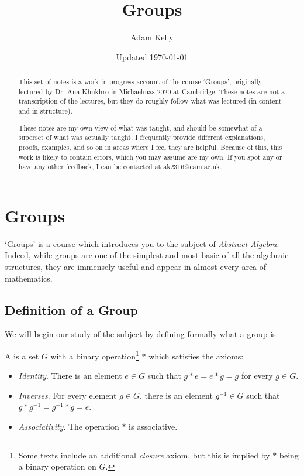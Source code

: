 \documentclass[a4]{scrreprt}
\title{Groups}
\author{Adam Kelly}
\date{Updated \today}
\begin{document}
\maketitle

\begin{abstract}
	This set of notes is a work-in-progress account of the course `Groups', originally lectured by Dr. Ana Khukhro in Michaelmas 2020 at Cambridge. These notes are not a transcription of the lectures, but they do roughly follow what was lectured (in content and in structure).

	These notes are my own view of what was taught, and should be somewhat of a superset of what was actually taught. I frequently provide different explanations, proofs, examples, and so on in areas where I feel they are helpful. Because of this, this work is likely to contain errors, which you may assume are my own. If you spot any or have any other feedback, I can be contacted at \href{mailto:ak2316@cam.ac.uk}{ak2316@cam.ac.uk}.
\end{abstract}

\tableofcontents

\clearpage


\chapter{Groups}

`Groups' is a course which introduces you to the subject of \emph{Abstract Algebra}.
Indeed, while groups are one of the simplest and most basic of all the algebraic structures, they are immensely useful and appear in almost every area of mathematics. 

\section{Definition of a Group}

We will begin our study of the subject by defining formally what a group is.

\begin{definition}[Group]
	A  is a set $G$ with a binary operation\footnote{Some texts include an additional \emph{closure} axiom, but this is implied by $*$ being a binary operation on $G$.} $*$ which satisfies the axioms:
	\begin{itemize}
		\item \emph{Identity}. There is an element $e \in G$ such that $g * e = e * g = g$ for every $g \in G$.
		\item \emph{Inverses}. For every element $g \in G$, there is an element $g^{-1} \in G$ such that $g * g^{-1} = g^{-1} * g = e$.
		\item \emph{Associativity}. The operation $*$ is associative.
	\end{itemize}
\end{definition}
\end{document}
